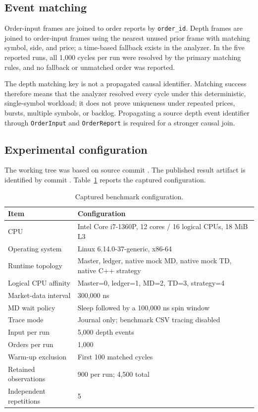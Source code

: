 \documentclass[11pt]{article}
\begin{document}
\subsection{Event matching}

Order-input frames are joined to order reports by \texttt{order\_id}. Depth frames are joined to order-input frames using the nearest unused prior frame with matching symbol, side, and price; a time-based fallback exists in the analyzer. In the five reported runs, all 1,000 cycles per run were resolved by the primary matching rules, and no fallback or unmatched order was reported.

The depth matching key is not a propagated causal identifier. Matching success therefore means that the analyzer resolved every cycle under this deterministic, single-symbol workload; it does not prove uniqueness under repeated prices, bursts, multiple symbols, or backlog. Propagating a source depth event identifier through \texttt{OrderInput} and \texttt{OrderReport} is required for a stronger causal join.

\subsection{Experimental configuration}

The working tree was based on source commit . The published result artifact is identified by commit  \cite{godzillaartifact2026}. Table~\ref{tab:config} reports the captured configuration.

\begin{table}[ht]
\centering
\caption{Captured benchmark configuration.}
\label{tab:config}
\small
\begin{tabularx}{\textwidth}{@{}p{}X@{}}
\toprule
Item & Configuration \\
\midrule
CPU & Intel Core i7-1360P, 12 cores / 16 logical CPUs, 18 MiB L3 \\
Operating system & Linux 6.14.0-37-generic, x86-64 \\
Runtime topology & Master, ledger, native mock MD, native mock TD, native C++ strategy \\
Logical CPU affinity & Master=0, ledger=1, MD=2, TD=3, strategy=4 \\
Market-data interval & 300,000 ns \\
MD wait policy & Sleep followed by a 100,000 ns spin window \\
Trace mode & Journal only; benchmark CSV tracing disabled \\
Input per run & 5,000 depth events \\
Orders per run & 1,000 \\
Warm-up exclusion & First 100 matched cycles \\
Retained observations & 900 per run; 4,500 total \\
Independent repetitions & 5 \\
\bottomrule
\end{tabularx}
\end{table}
\end{document}
